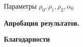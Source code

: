 Параметры $\rho_0, \rho_1, \rho_2, \alpha_0$


\begin{center}
\textbf{Апробация результатов.}
\end{center}


\begin{center}
\textbf{Благодарности}
\end{center}




